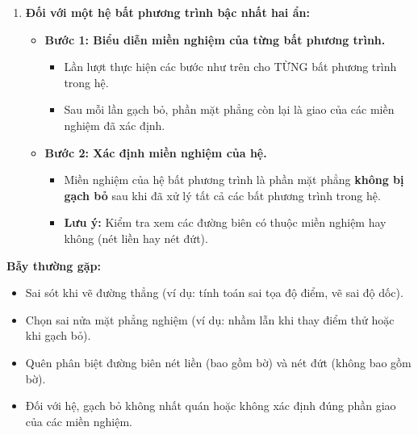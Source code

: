 \begin{phuongphap}
\begin{enumerate}
\begin{itemize}
\begin{itemize}
        \end{itemize}
    \end{itemize}
    \item \textbf{Đối với một hệ bất phương trình bậc nhất hai ẩn:}
    \begin{itemize}
        \item \textbf{Bước 1: Biểu diễn miền nghiệm của từng bất phương trình.}
        \begin{itemize}
            \item Lần lượt thực hiện các bước như trên cho TỪNG bất phương trình trong hệ.
            \item Sau mỗi lần gạch bỏ, phần mặt phẳng còn lại là giao của các miền nghiệm đã xác định.
        \end{itemize}
        \item \textbf{Bước 2: Xác định miền nghiệm của hệ.}
        \begin{itemize}
            \item Miền nghiệm của hệ bất phương trình là phần mặt phẳng \textbf{không bị gạch bỏ} sau khi đã xử lý tất cả các bất phương trình trong hệ.
            \item \textbf{Lưu ý:} Kiểm tra xem các đường biên có thuộc miền nghiệm hay không (nét liền hay nét đứt).
        \end{itemize}
    \end{itemize}
\end{enumerate}
\textbf{Bẫy thường gặp:}
\begin{itemize}
    \item Sai sót khi vẽ đường thẳng (ví dụ: tính toán sai tọa độ điểm, vẽ sai độ dốc).
    \item Chọn sai nửa mặt phẳng nghiệm (ví dụ: nhầm lẫn khi thay điểm thử hoặc khi gạch bỏ).
    \item Quên phân biệt đường biên nét liền (bao gồm bờ) và nét đứt (không bao gồm bờ).
    \item Đối với hệ, gạch bỏ không nhất quán hoặc không xác định đúng phần giao của các miền nghiệm.
\end{itemize}
\end{phuongphap}
